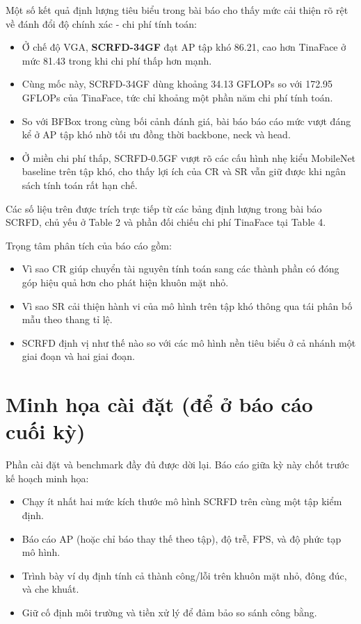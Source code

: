 Một số kết quả định lượng tiêu biểu trong bài báo cho thấy mức cải thiện rõ rệt về đánh đổi độ chính xác - chi phí tính toán:
\begin{itemize}
  \item Ở chế độ VGA, \textbf{SCRFD-34GF} đạt AP tập khó 86.21, cao hơn TinaFace ở mức 81.43 trong khi chi phí thấp hơn mạnh.
  \item Cùng mốc này, SCRFD-34GF dùng khoảng 34.13 GFLOPs so với 172.95 GFLOPs của TinaFace, tức chỉ khoảng một phần năm chi phí tính toán.
  \item So với BFBox trong cùng bối cảnh đánh giá, bài báo báo cáo mức vượt đáng kể ở AP tập khó nhờ tối ưu đồng thời backbone, neck và head.
  \item Ở miền chi phí thấp, SCRFD-0.5GF vượt rõ các cấu hình nhẹ kiểu MobileNet baseline trên tập khó, cho thấy lợi ích của CR và SR vẫn giữ được khi ngân sách tính toán rất hạn chế.
\end{itemize}
Các số liệu trên được trích trực tiếp từ các bảng định lượng trong bài báo SCRFD, chủ yếu ở Table 2 và phần đối chiếu chi phí TinaFace tại Table 4.  \cite{guo2022scrfd}

Trọng tâm phân tích của báo cáo gồm:
\begin{itemize}
  \item Vì sao CR giúp chuyển tài nguyên tính toán sang các thành phần có đóng góp hiệu quả hơn cho phát hiện khuôn mặt nhỏ.
  \item Vì sao SR cải thiện hành vi của mô hình trên tập khó thông qua tái phân bố mẫu theo thang tỉ lệ.
  \item SCRFD định vị như thế nào so với các mô hình nền tiêu biểu ở cả nhánh một giai đoạn và hai giai đoạn.
\end{itemize}

\section{Minh họa cài đặt (để ở báo cáo cuối kỳ)}

Phần cài đặt và benchmark đầy đủ được dời lại. Báo cáo giữa kỳ này chốt trước kế hoạch minh họa:
\begin{itemize}
  \item Chạy ít nhất hai mức kích thước mô hình SCRFD trên cùng một tập kiểm định.
  \item Báo cáo AP (hoặc chỉ báo thay thế theo tập), độ trễ, FPS, và độ phức tạp mô hình.
  \item Trình bày ví dụ định tính cả thành công/lỗi trên khuôn mặt nhỏ, đông đúc, và che khuất.
  \item Giữ cố định môi trường và tiền xử lý để đảm bảo so sánh công bằng.
\end{itemize}

